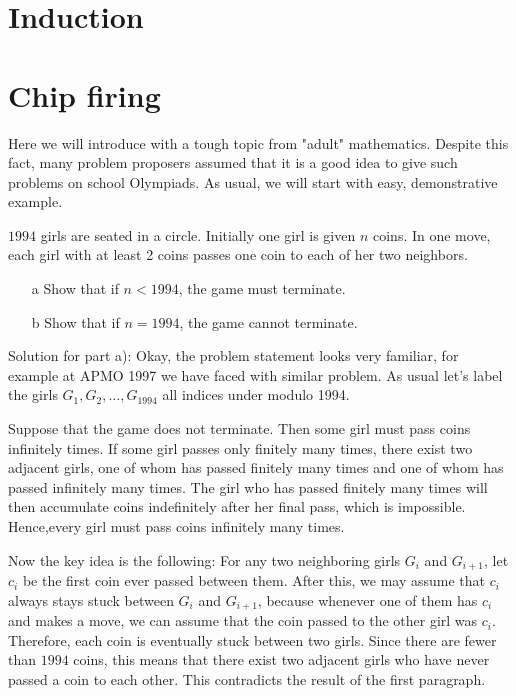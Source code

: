 \begin{example}

\end{example}

\section{Induction}

\begin{example}

\end{example}

\section{Chip firing}

Here we will introduce with a tough topic from "adult" mathematics. Despite this fact, many problem proposers assumed that it is a good idea to give such problems on school Olympiads. As usual, we will start with easy, demonstrative example. 

\begin{example}[ISL 1994]
    $1994$ girls are seated in a circle. Initially one girl is given $n$ coins. In one move, each girl with at least 2 coins passes one coin to each of her two neighbors. 
    \begin{itemize}
        \item[a] Show that if $n<1994$, the game must terminate.
        \item[b] Show that if $n=1994$, the game cannot terminate.
    \end{itemize}
\end{example}

\sol 

Solution for part a): Okay, the problem statement looks very familiar, for example at APMO 1997 we have faced with similar problem. As usual let's label the girls $G_1, G_2, \dots, G_{1994}$ all indices under modulo 1994.

Suppose that the game does not terminate. Then some girl must pass coins infinitely times. If some girl passes only finitely many times, there exist two adjacent girls, one of whom has passed finitely many times and one of whom has passed infinitely many times. The girl who has passed finitely many times will then accumulate coins indefinitely after her final pass, which is impossible. Hence,every girl must pass coins infinitely many times. 

Now the key idea is the following: For any two neighboring girls $G_i$ and $G_{i+1}$, let $c_i$ be the first coin ever passed between them. After this, we may assume that $c_i$ always stays stuck between $G_i$ and $G_{i+1}$, because whenever one of them has $c_i$ and makes a move, we can assume that the coin passed to the other girl was $c_i$. Therefore, each coin is eventually stuck between two girls. Since there are fewer than $1994$ coins, this means that there exist two adjacent girls who have never passed a coin to each other. This contradicts the result of the first paragraph.

